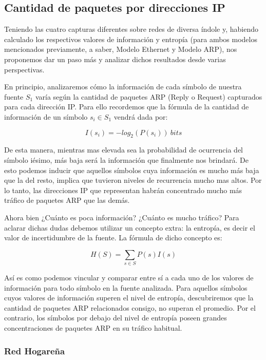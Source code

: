 \subsection{Cantidad de paquetes por direcciones IP}

Teniendo las cuatro capturas diferentes sobre redes de diversa índole y, habiendo calculado los respectivos valores de información y entropía (para ambos modelos mencionados previamente, a saber, Modelo Ethernet y Modelo ARP), nos proponemos dar un paso más y analizar dichos resultados desde varias perspectivas.

En principio, analizaremos cómo la información de cada símbolo de nuestra fuente $S_1$ varía según la cantidad de paquetes ARP (Reply o Request) capturados para cada dirección IP. Para ello recordemos que la fórmula de la cantidad de información de un símbolo $s_i \in S_1$ vendrá dada por:

\begin{equation}
 I(s_{i}) = -log_{2}(P(s_{i}))\ bits
\end{equation}

De esta manera, mientras mas elevada sea la probabilidad de ocurrencia del símbolo iésimo, más baja será la información que finalmente nos brindará. De esto podemos inducir que aquellos símbolos cuya información es mucho más baja que la del resto, implica que tuvieron niveles de recurrencia mucho mas altos. Por lo tanto, las direcciones IP que representan habrán concentrado mucho más tráfico de paquetes ARP que las demás.

Ahora bien ¿Cuánto es poca información? ¿Cuánto es mucho tráfico? Para aclarar dichas dudas debemos utilizar un concepto extra: la entropía, es decir el valor de incertidumbre de la fuente. La fórmula de dicho concepto es:

\begin{equation}
 H(S) = \sum_{s \in S} P(s) I(s)
\end{equation}

Así es como podemos vincular y comparar entre sí a cada uno de los valores de información para todo símbolo en la fuente analizada. Para aquellos símbolos cuyos valores de información superen el nivel de entropía, descubriremos que la cantidad de paquetes ARP relacionados consigo, no superan el promedio. Por el contrario, los símbolos por debajo del nivel de entropía poseen grandes concentraciones de paquetes ARP en su tráfico habitual.

\subsubsection{Red Hogareña}

